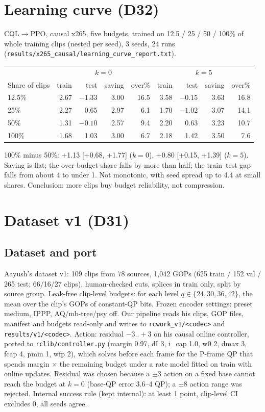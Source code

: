 \documentclass[10pt,a4paper]{article}
\newcommand{\code}[1]{\texttt{\small #1}}
\begin{document}
\section{Learning curve (D32)}
CQL$\to$PPO, causal x265, five budgets, trained on 12.5 / 25 / 50 / 100\% of whole training clips (nested per seed), 3
seeds, 24 runs (\code{results/x265\_causal/learning\_curve\_report.txt}).
\begin{center}\small
\begin{tabular}{lrrrr|rrrr}
\toprule
& \multicolumn{4}{c|}{$k=0$} & \multicolumn{4}{c}{$k=5$} \\
Share of clips & train & test & saving & over\% & train & test & saving & over\% \\\midrule
12.5\% & 2.67 & $-1.33$ & 3.00 & 16.5 & 3.58 & $-0.15$ & 3.63 & 16.8 \\
25\% & 2.27 & 0.65 & 2.97 & 6.1 & 1.70 & $-1.02$ & 3.07 & 14.1 \\
50\% & 1.31 & $-0.10$ & 2.57 & 9.4 & 2.20 & 0.63 & 3.23 & 10.7 \\
100\% & 1.68 & 1.03 & 3.00 & 6.7 & 2.18 & 1.42 & 3.50 & 7.6 \\
\bottomrule
\end{tabular}
\end{center}
100\% minus 50\%: +1.13 [+0.68, +1.77] ($k=0$), +0.80 [+0.15, +1.39] ($k=5$). Saving is flat; the over-budget share
falls by more than half; the train--test gap falls from about 4 to under 1. Not monotonic, with seed spread up to 4.4
at small shares. Conclusion: more clips buy budget reliability, not compression.

\section{Dataset v1 (D31)}
\subsection{Dataset and port}
Aayush's dataset v1: 109 clips from 78 sources, 1,042 GOPs (625 train / 152 val / 265 test; 66/16/27 clips),
human-checked cuts, splices in train only, split by source group. Leak-free clip-level budgets: for each level
$q\in\{24,30,36,42\}$, the mean over the clip's GOPs of constant-QP bits. Frozen encoder settings: preset medium,
IPPP, AQ/mb-tree/psy off. Our pipeline reads his clips, GOP files, manifest and budgets read-only and writes to
\code{rcwork\_v1/<codec>} and \code{results/v1/<codec>}. Action: residual $-3..+3$ on his causal online controller,
ported to \code{rclib/controller.py} (margin 0.97, dI 3, i\_cap 1.0, w0 2, dmax 3, fcap 4, pmin 1, wfp 2), which
solves before each frame for the P-frame QP that spends margin $\times$ the remaining budget under a rate model fitted
on train with online updates. Residual was chosen because a $\pm$3 action on a fixed base cannot reach the budget at
$k=0$ (base-QP error 3.6--4 QP); a $\pm$8 action range was rejected. Internal success rule (kept internal): at least
1 point, clip-level CI excludes 0, all seeds agree.
\end{document}
